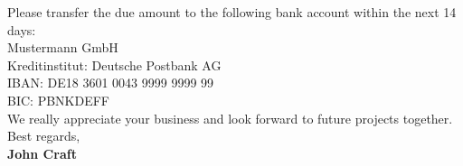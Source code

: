 \documentclass[12pt, letterpaper]{article}
\newcommand{\myName}{
\textbf{John Craft}%
}
\begin{document}
\vspace{1cm}
{\footnotesize
Please transfer the due amount to the following bank account within the next {14} days:\\ %
\vspace{0.3cm}
{Mustermann GmbH}\\%
{Kreditinstitut: Deutsche Postbank AG}\\%
{IBAN: DE18 3601 0043 9999 9999 99}\\%
{BIC: PBNKDEFF}\\%
\vspace{0.3cm}
{We really appreciate your business and look forward to future projects together.}\\ %
\vspace{0.2cm}
Best regards,\\
\myName
}
\end{document}
